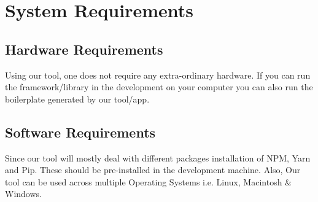 \section{System Requirements}

\subsection{Hardware Requirements}
Using our tool, one does not require any extra-ordinary hardware. If you can run the framework/library in the development on your computer you can also run the boilerplate generated by our tool/app.

\subsection{Software Requirements}
Since our tool will mostly deal with different packages installation of NPM, Yarn and Pip. These should be pre-installed in the development machine. Also, Our tool can be used across multiple Operating Systems i.e. Linux, Macintosh & Windows.
